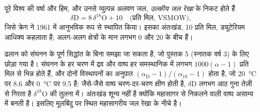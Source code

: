 \begin{proposition}[उल्कीय जल रेखा]\label{prop:b2:isotope-geochemistry:mwl}
पूरे विश्व की वर्षा और हिम, और उनसे व्युत्पन्न अलवण जल,
\emph{उल्कीय जल रेखा} के निकट होते हैं
\[
  \delta\mathrm{D} = 8\,\delta^{18}\mathrm{O} + 10 \quad\text{(प्रति मिल, VSMOW)},
\]
जिसे क्रेग ने 1961 में आनुभविक रूप से स्थापित किया। इसका अंतःखंड, 10 प्रति मिल,
ड्यूटेरियम आधिक्य कहलाता है; अलग-अलग क्षेत्रों के मान लगभग 0 और 20 के बीच हैं।
\end{proposition}
\admitted

\noindent ढलान को संघनन के पूर्ण सिद्धांत के बिना समझा जा सकता है,
जो पुस्तक 5 (स्नातक वर्ष 3) के लिए छोड़ा गया है। संघनन के हर चरण में द्रव
और वाष्प हर समस्थानिक में लगभग $1000(\alpha - 1)$ प्रति मिल से भिन्न होते हैं, और
दोनों विस्थापनों का अनुपात $(\alpha_{\mathrm D}-1)/(\alpha_{18}-1)$ होता है, जो
\qty{20}{\degreeCelsius} पर 8.6 और \qty{0}{\degreeCelsius} पर 9.5 है: जैसे-जैसे
वाष्प चरण-दर-चरण क्षीण होती है, $\delta\mathrm{D}$ लगभग आठ गुना तेज़ी से गिरता है
$\delta^{18}\mathrm{O}$ की तुलना में। अंतःखंड शून्य नहीं है क्योंकि महासागर से निकलने वाली
वाष्प असाम्य में बनती है। इसलिए मूलबिंदु पर स्थित महासागरीय जल
रेखा के नीचे है।

